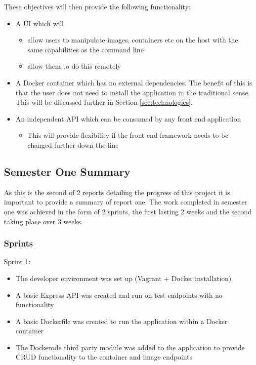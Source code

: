 These objectives will then provide the following functionality:

\begin{itemize}
	\item A UI which will 
	\begin{itemize}
		\item allow users to manipulate images, containers etc on the host with the same capabilities as the command line
		\item allow them to do this remotely
	\end{itemize}
	\item A \gls{Docker container} which has no external dependencies. The benefit of this is that the user does not need to install the application in the traditional sense. This will be discussed further in Section \ref{sec:technologies}.
	\item An independent API which can be consumed by any front end application
	\begin{itemize}
		\item This will provide flexibility if the front end framework needs to be changed further down the line
	\end{itemize}
\end{itemize}

\subsection{Semester One Summary}
As this is the second of 2 reports detailing the progress of this project it is important to provide a summary of report one. The work completed in semester one was achieved in the form of 2 sprints, the first lasting 2 weeks and the second taking place over 3 weeks.

\subsubsection{Sprints}
Sprint 1:
\begin{itemize}
	\item The developer environment was set up (Vagrant + Docker installation)
	\item A basic Express \gls{API} was created and run on test endpoints with no functionality
	\item A basic Dockerfile was created to run the application within a Docker container
	\item The Dockerode third party module was added to the application to provide \gls{CRUD} functionality to the container and image endpoints
\end{itemize} 
	

